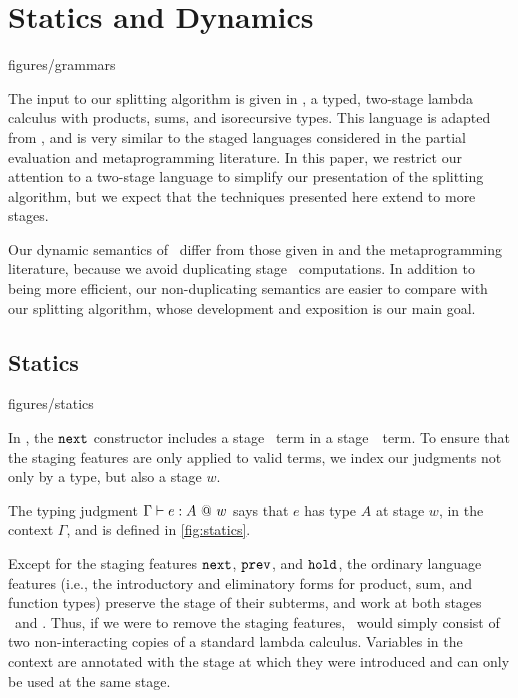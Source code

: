 \section{\texorpdfstring{\lang}{λ12} Statics and Dynamics}
\label{sec:semantics}



 {figures/grammars}

The input to our splitting algorithm is given in \lang, a typed, two-stage
lambda calculus with products, sums, and isorecursive types. This language is
adapted from \cite{davies96}, and is very similar to the staged languages
considered in the partial evaluation and metaprogramming literature. In this
paper, we restrict our attention to a two-stage language to simplify our
presentation of the splitting algorithm, but we expect that the techniques
presented here extend to more stages.

Our dynamic semantics of \lang\ differ from those given in \cite{davies96} and
the metaprogramming literature, because we avoid duplicating stage \bbtwo\
computations. In addition to being more efficient, our non-duplicating semantics
are easier to compare with our splitting algorithm, whose development and
exposition is our main goal.


\subsection{Statics}

 {figures/statics}

In \lang, the ${\tt next}$ constructor includes a stage \bbtwo\ term in a
stage~\bbone\ term. To ensure that the staging features are only applied to
valid terms, we index our judgments not only by a type, but also a stage $w$.

The typing judgment $\Gamma{} \vdash {e}:{A}~@~w$ says that $e$ has type $A$ at stage $w$, in
the context $\Gamma$, and is defined in \cref{fig:statics}.


Except for the staging features ${\tt next}$, ${\tt prev}$, and ${\tt hold}$, the ordinary
language features (i.e., the introductory and eliminatory forms for product,
sum, and function types) preserve the stage of their subterms, and work at both
stages \bbone\ and \bbtwo. Thus, if we were to remove the staging features,
\lang\ would simply consist of two non-interacting copies of a standard lambda
calculus. Variables in the context are annotated with the stage at which they
were introduced and can only be used at the same stage.

